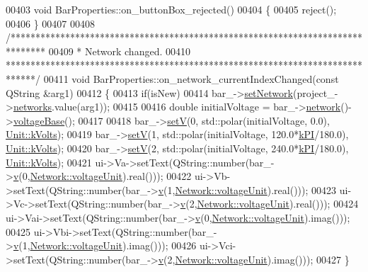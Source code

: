 \begin{DoxyCode}
00403 \textcolor{keywordtype}{void} BarProperties::on\_buttonBox\_rejected()
00404 \{
00405   reject();
00406 \}
00407 
00408 \textcolor{comment}{/*******************************************************************************}
00409 \textcolor{comment}{ * Network changed.}
00410 \textcolor{comment}{ ******************************************************************************/}
00411 \textcolor{keywordtype}{void} BarProperties::on\_network\_currentIndexChanged(\textcolor{keyword}{const} QString &arg1)
00412 \{
00413   \textcolor{keywordflow}{if}(isNew)
00414     bar\_->\hyperlink{group___models_gade9a307fdb6a81871787899ec1af5833}{setNetwork}(project\_->\hyperlink{class_project_aa98126154cab59769a431668e6f17daf}{networks}.value(arg1));
00415 
00416   \textcolor{keywordtype}{double} initialVoltage = bar\_->\hyperlink{group___models_gab0594d5d7313e8749bb85434b255db9a}{network}()->\hyperlink{group___models_ga88cd2506aaf0b19513e41f00608093e0}{voltageBase}();
00417 
00418   bar\_->\hyperlink{group___models_ga8d1e70b2d11ed4245e81b8b20858079d}{setV}(0, std::polar(initialVoltage, 0.0), \hyperlink{class_unit_a55b07dfa9457e1eca2c7194fe0cfc3c1aa54b2473993a702a3923525765bd6e4c}{Unit::kVolts});
00419   bar\_->\hyperlink{group___models_ga8d1e70b2d11ed4245e81b8b20858079d}{setV}(1, std::polar(initialVoltage, 120.0*\hyperlink{math__constants_8h_a368d99984512d9a6c6f18b37b4446431}{kPI}/180.0), \hyperlink{class_unit_a55b07dfa9457e1eca2c7194fe0cfc3c1aa54b2473993a702a3923525765bd6e4c}{Unit::kVolts});
00420   bar\_->\hyperlink{group___models_ga8d1e70b2d11ed4245e81b8b20858079d}{setV}(2, std::polar(initialVoltage, 240.0*\hyperlink{math__constants_8h_a368d99984512d9a6c6f18b37b4446431}{kPI}/180.0), \hyperlink{class_unit_a55b07dfa9457e1eca2c7194fe0cfc3c1aa54b2473993a702a3923525765bd6e4c}{Unit::kVolts});
00421   ui->Va->setText(QString::number(bar\_->\hyperlink{group___models_gab3ed62a7f2eb9c41a0b84543f1ef8d3b}{v}(0,\hyperlink{group___models_gacde031ef95f5c05565ee35769f2ed89e}{Network::voltageUnit}).real()));
00422   ui->Vb->setText(QString::number(bar\_->\hyperlink{group___models_gab3ed62a7f2eb9c41a0b84543f1ef8d3b}{v}(1,\hyperlink{group___models_gacde031ef95f5c05565ee35769f2ed89e}{Network::voltageUnit}).real()));
00423   ui->Vc->setText(QString::number(bar\_->\hyperlink{group___models_gab3ed62a7f2eb9c41a0b84543f1ef8d3b}{v}(2,\hyperlink{group___models_gacde031ef95f5c05565ee35769f2ed89e}{Network::voltageUnit}).real()));
00424   ui->Vai->setText(QString::number(bar\_->\hyperlink{group___models_gab3ed62a7f2eb9c41a0b84543f1ef8d3b}{v}(0,\hyperlink{group___models_gacde031ef95f5c05565ee35769f2ed89e}{Network::voltageUnit}).imag()));
00425   ui->Vbi->setText(QString::number(bar\_->\hyperlink{group___models_gab3ed62a7f2eb9c41a0b84543f1ef8d3b}{v}(1,\hyperlink{group___models_gacde031ef95f5c05565ee35769f2ed89e}{Network::voltageUnit}).imag()));
00426   ui->Vci->setText(QString::number(bar\_->\hyperlink{group___models_gab3ed62a7f2eb9c41a0b84543f1ef8d3b}{v}(2,\hyperlink{group___models_gacde031ef95f5c05565ee35769f2ed89e}{Network::voltageUnit}).imag()));
00427 \}
\end{DoxyCode}
